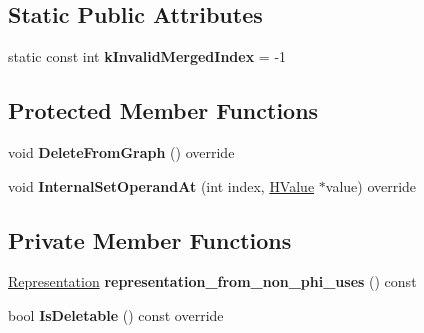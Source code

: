\subsection*{Static Public Attributes}
\begin{DoxyCompactItemize}
\item 
static const int {\bfseries k\+Invalid\+Merged\+Index} = -\/1\hypertarget{classv8_1_1internal_1_1_h_phi_a43bb73e94ded110d46825371668d1398}{}\label{classv8_1_1internal_1_1_h_phi_a43bb73e94ded110d46825371668d1398}

\end{DoxyCompactItemize}
\subsection*{Protected Member Functions}
\begin{DoxyCompactItemize}
\item 
void {\bfseries Delete\+From\+Graph} () override\hypertarget{classv8_1_1internal_1_1_h_phi_a2fa1c273178dec5f70fd907462567987}{}\label{classv8_1_1internal_1_1_h_phi_a2fa1c273178dec5f70fd907462567987}

\item 
void {\bfseries Internal\+Set\+Operand\+At} (int index, \hyperlink{classv8_1_1internal_1_1_h_value}{H\+Value} $\ast$value) override\hypertarget{classv8_1_1internal_1_1_h_phi_afcdda62ba586a0c3af51024111fd5655}{}\label{classv8_1_1internal_1_1_h_phi_afcdda62ba586a0c3af51024111fd5655}

\end{DoxyCompactItemize}
\subsection*{Private Member Functions}
\begin{DoxyCompactItemize}
\item 
\hyperlink{classv8_1_1internal_1_1_representation}{Representation} {\bfseries representation\+\_\+from\+\_\+non\+\_\+phi\+\_\+uses} () const \hypertarget{classv8_1_1internal_1_1_h_phi_a001c9d9a670ef810acaf4440009319d0}{}\label{classv8_1_1internal_1_1_h_phi_a001c9d9a670ef810acaf4440009319d0}

\item 
bool {\bfseries Is\+Deletable} () const  override\hypertarget{classv8_1_1internal_1_1_h_phi_a5a8b62bfd1048a4271cb6c0a053f5264}{}\label{classv8_1_1internal_1_1_h_phi_a5a8b62bfd1048a4271cb6c0a053f5264}

\end{DoxyCompactItemize}
